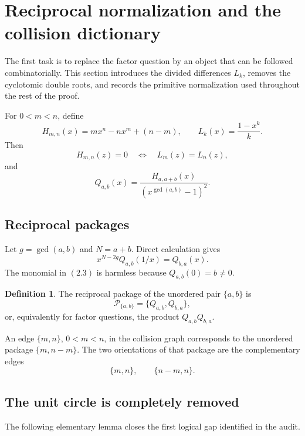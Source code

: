\documentclass[11pt]{article}
\theoremstyle{definition}
\newtheorem{definition}[theorem]{Definition}
\newcommand{\Package}{\mathcal P}
\begin{document}
\section{Reciprocal normalization and the collision dictionary}
\label{sec:dictionary}

The first task is to replace the factor question by an object that can be followed combinatorially.  This section introduces the divided differences \(L_k\), removes the cyclotomic double roots, and records the primitive normalization used throughout the rest of the proof.

For \(0<m<n\), define
\[
 H_{m,n}(x)=mx^n-nx^m+(n-m),
 \qquad
 L_k(x)=\frac{1-x^k}{k}.
\]
Then
\begin{equation}
 H_{m,n}(z)=0
 \quad\Longleftrightarrow\quad
 L_m(z)=L_n(z),
 \tag{2.1}
\end{equation}
and
\begin{equation}
 Q_{a,b}(x)=
 \frac{H_{a,a+b}(x)}{(x^{\gcd(a,b)}-1)^2}.
 \tag{2.2}
\end{equation}

\subsection{Reciprocal packages}

Let \(g=\gcd(a,b)\) and \(N=a+b\).  Direct calculation gives
\begin{equation}
 x^{N-2g}Q_{a,b}(1/x)=Q_{b,a}(x).
 \tag{2.3}
\end{equation}
The monomial in \((2.3)\) is harmless because \(Q_{a,b}(0)=b\neq0\).

\begin{definition}
The reciprocal package of the unordered pair \(\{a,b\}\) is
\[
 \Package_{\{a,b\}}=\{Q_{a,b},Q_{b,a}\},
\]
or, equivalently for factor questions, the product \(Q_{a,b}Q_{b,a}\).
\end{definition}

An edge \(\{m,n\}\), \(0<m<n\), in the collision graph corresponds to the
unordered package \(\{m,n-m\}\).  The two orientations of that package are the
complementary edges
\[
 \{m,n\},\qquad \{n-m,n\}.
 \tag{2.4}
\]

\subsection{The unit circle is completely removed}

The following elementary lemma closes the first logical gap identified in the
audit.
\end{document}
